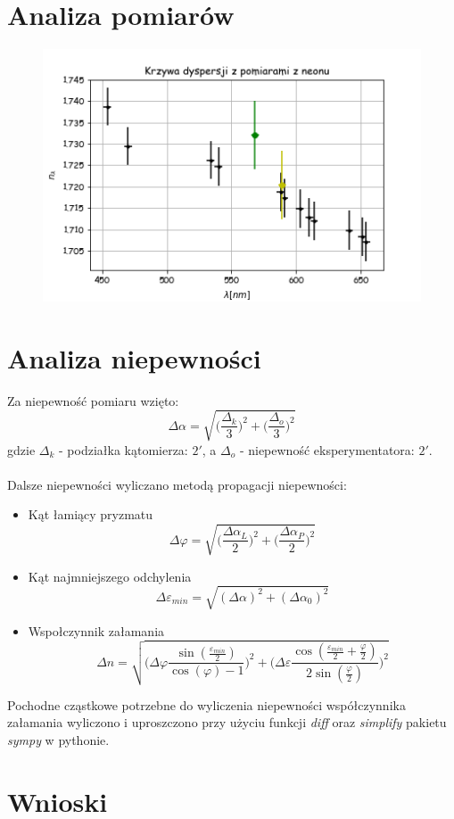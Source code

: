 \documentclass[a4paper,10pt]{article}
\begin{document}
\section{Analiza pomiarów}
\begin{figure} [H]
  \includegraphics{./Punkty.png}
  \caption{}
  \label{}
\end{figure}

\section{Analiza niepewności}
Za niepewność pomiaru wzięto:
\begin{equation}
  \Delta \alpha = \sqrt{\bigg(\frac{\Delta_k}{3}\bigg)^2+\bigg(\frac{\Delta_o}{3}\bigg)^2}
\end{equation}
gdzie $\Delta_k$ - podziałka kątomierza: $2'$, a $\Delta_o$ - niepewność eksperymentatora: $2'$.\\
\\Dalsze niepewności wyliczano metodą propagacji niepewności:
\begin{itemize}
  \item Kąt łamiący pryzmatu
  \begin{equation}
    \Delta \varphi = \sqrt{\bigg(\frac{\Delta \alpha_L}{2}\bigg)^2+\bigg(\frac{\Delta \alpha_P}{2}\bigg)^2}
  \end{equation}
  \item Kąt najmniejszego odchylenia
  \begin{equation}
    \Delta \varepsilon_{min} = \sqrt{(\Delta \alpha)^2+(\Delta \alpha_0)^2}
  \end{equation}
  \item Wspołczynnik załamania
  \begin{equation}
    \Delta n = \sqrt{\bigg(\Delta \varphi \frac{\sin{\left (\frac{\varepsilon_{min}}{2} \right )}}{\cos{\left (\varphi \right )} - 1}\bigg)^2+
    \bigg(\Delta \varepsilon \frac{\cos{\left (\frac{\varepsilon_{min}}{2} + \frac{\varphi}{2} \right )}}{2 \sin{\left (\frac{\varphi}{2} \right )}}\bigg)^2}
  \end{equation}
\end{itemize}
Pochodne cząstkowe potrzebne do wyliczenia niepewności współczynnika załamania wyliczono i uproszczono przy użyciu funkcji \emph{diff} oraz \emph{simplify} pakietu \emph{sympy} w pythonie.
\section{Wnioski}
\end{document}
